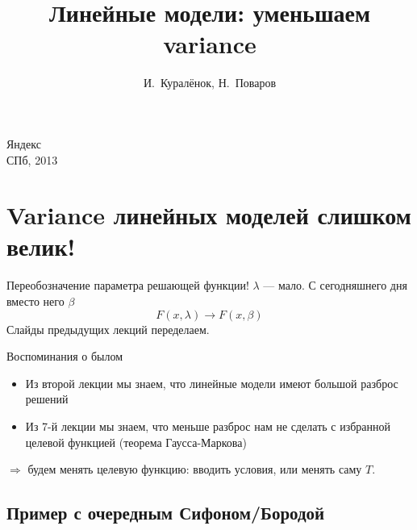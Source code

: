 \documentclass[14pt, fleqn, xcolor={dvipsnames, table}]{beamer}
\title{Линейные модели: уменьшаем variance\\\small{}}
\author[]{\small{%
И.~Куралёнок,
Н.~Поваров}}
\date{}
\begin{document}
\begin{frame}
\maketitle
\small
\begin{center}
\vspace{-60pt}
\normalsize {\color{red}Я}ндекс \\
\vspace{80pt}
\footnotesize СПб, 2013
\end{center}
\end{frame}



\section{Variance линейных моделей слишком велик!}
\begin{frame}{Переобозначение параметра решающей функции!}
$\lambda$ --- мало. С сегодняшнего дня вместо него $\beta$
$$
F(x, \lambda) \to F(x, \beta)
$$
Слайды предыдущих лекций переделаем.
\end{frame}

\begin{frame}{Воспоминания о былом}
\begin{itemize}
  \item Из второй лекции мы знаем, что линейные модели имеют большой разброс решений
  \item Из 7-й лекции мы знаем, что меньше разброс нам не сделать с избранной целевой функцией (теорема Гаусса-Маркова)
\end{itemize}
$\Rightarrow$ будем менять целевую функцию: вводить условия, или менять саму $T$.
\end{frame}

\subsection{Пример с очередным Сифоном/Бородой}
\end{document}
